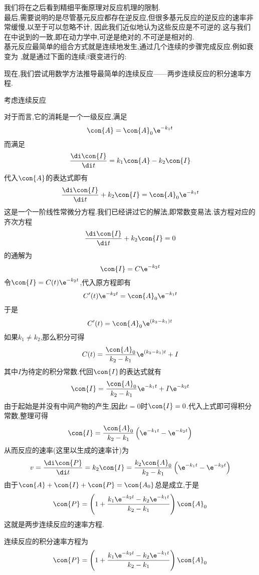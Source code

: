 \documentclass{ctexart}
\begin{document}
我们将在之后看到精细平衡原理对反应机理的限制.\\
\indent 最后,需要说明的是尽管基元反应都存在逆反应,但很多基元反应的逆反应的速率非常缓慢,以至于可以忽略不计,%
因此我们近似地认为这些反应是不可逆的.这与我们在中说到的一致,即在动力学中,可逆是绝对的,不可逆是相对的.\vspace{12pt}\\
\indent 基元反应最简单的组合方式就是连续地发生,通过几个连续的步骤完成反应.例如衰变为%
,就是通过下面的连续$\beta$衰变进行的:
\begin{tightcenter}
\end{tightcenter}
现在,我们尝试用数学方法推导最简单的连续反应——两步连续反应的积分速率方程.
\begin{derivation}
    考虑连续反应
    \begin{tightcenter}
    \end{tightcenter}
    对于而言,它的消耗是一个一级反应,满足
    \[\con{A}=\con{A}_0\e^{-k_1t}\]
    而满足
    \[\dfrac{\di\con{I}}{\di t}=k_1\con{A}-k_2\con{I}\]
    代入$\con{A}$的表达式即有
    \[\dfrac{\di\con{I}}{\di t}+k_2\con{I}=\con{A}_0\e^{-k_1t}\]
    这是一个一阶线性常微分方程.我们已经讲过它的解法,即常数变易法.该方程对应的齐次方程
    \[\dfrac{\di\con{I}}{\di t}+k_2\con{I}=0\]
    的通解为
    \[\con{I}=C\e^{-k_2t}\]
    令$\con{I}=C(t)\e^{-k_2t}$,代入原方程即有
    \[C'(t)\e^{-k_2t}=\con{A}_0\e^{-k_1t}\]
    于是
    \[C'(t)=\con{A}_0\e^{\left(k_2-k_1\right)t}\]
    如果$k_1\neq k_2$,那么积分可得
    \[C(t)=\dfrac{\con{A}_0}{k_2-k_1}\e^{\left(k_2-k_1\right)t}+I\]
    其中$I$为待定的积分常数.代回$\con{I}$的表达式就有
    \[\con{I}=\dfrac{\con{A}_0}{k_2-k_1}\e^{-k_1t}+I\e^{-k_2t}\]
    由于起始是并没有中间产物的产生,因此$t=0$时$\con{I}=0$.代入上式即可得积分常数,整理可得
    \[\con{I}=\dfrac{\con{A}_0}{k_2-k_1}\left(\e^{-k_1t}-\e^{-k_2t}\right)\]
    从而反应的速率(这里以生成的速率计)为
    \[v=\dfrac{\di\con{P}}{\di t}=k_2\con{I}=\dfrac{k_2\con{A}_0}{k_2-k_1}\left(\e^{-k_1t}-\e^{-k_2t}\right)\]
    由于$\con{A}+\con{I}+\con{P}=\con{A_0}$总是成立,于是
    \[\con{P}=\left(1+\dfrac{k_1\e^{-k_2t}-k_2\e^{-k_1t}}{k_2-k_1}\right)\con{A}_0\]
    这就是两步连续反应的速率方程.
\end{derivation}
\begin{theorem}[7C.2.1 两步连续反应的积分速率方程]
    连续反应的积分速率方程为
    \[\con{P}=\left(1+\dfrac{k_1\e^{-k_2t}-k_2\e^{-k_1t}}{k_2-k_1}\right)\con{A}_0\]

\end{theorem}
\end{document}
